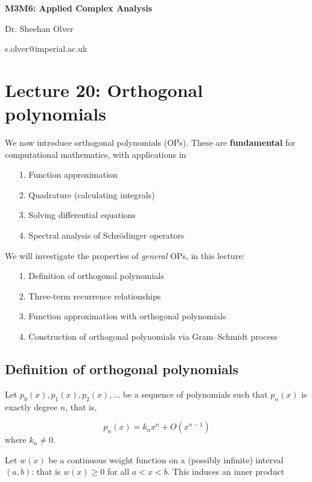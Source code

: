 \documentclass[12pt,a4paper]{article}
\def\endash{–}
\begin{document}
\textbf{M3M6: Applied Complex Analysis}

Dr. Sheehan Olver

s.olver@imperial.ac.uk

\section{Lecture 20: Orthogonal polynomials}
We now introduce orthogonal polynomials (OPs). These are \textbf{fundamental} for computational mathematics, with applications in

\begin{itemize}
\item[1. ] Function approximation


\item[2. ] Quadrature (calculating integrals)


\item[3. ] Solving differential equations


\item[4. ] Spectral analysis of Schrödinger operators

\end{itemize}
We will investigate the properties of \emph{general} OPs, in this lecture:

\begin{itemize}
\item[1. ] Definition of orthogonal polynomials


\item[2. ] Three-term recurrence relationships


\item[3. ] Function approximation with orthogonal polynomials    


\item[4. ] Construction of orthogonal polynomials via Gram\ensuremath{\endash}Schmidt process    

\end{itemize}
\subsection{Definition of orthogonal polynomials}
Let $p_0(x),p_1(x),p_2(x),\ensuremath{\dots}$ be a sequence of polynomials such that $p_n(x)$ is exactly degree $n$, that is,

\[
p_n(x) = k_n x^n + O(x^{n-1})
\]
where $k_n \neq 0$.

Let $w(x)$ be a continuous weight function on a (possibly infinite) interval $(a,b)$: that is $w(x) \geq 0$ for all $a < x < b$.  This induces an inner product
\end{document}
